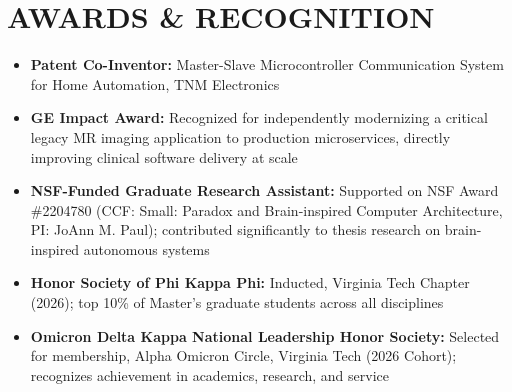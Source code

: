 \documentclass[letterpaper,10pt]{article}
\begin{document}
\section*{AWARDS \& RECOGNITION}
\begin{itemize}
    \item \textbf{Patent Co-Inventor:} Master-Slave Microcontroller Communication System for Home Automation, TNM Electronics
    \item \textbf{GE Impact Award:} Recognized for independently modernizing a critical legacy MR imaging application to production microservices, directly improving clinical software delivery at scale
    \item \textbf{NSF-Funded Graduate Research Assistant:} Supported on NSF Award \#2204780 (CCF: Small: Paradox and Brain-inspired Computer Architecture, PI: JoAnn M. Paul); contributed significantly to thesis research on brain-inspired autonomous systems
    \item \textbf{Honor Society of Phi Kappa Phi:} Inducted, Virginia Tech Chapter (2026); top 10\% of Master's graduate students across all disciplines
    \item \textbf{Omicron Delta Kappa National Leadership Honor Society:} Selected for membership, Alpha Omicron Circle, Virginia Tech (2026 Cohort); recognizes achievement in academics, research, and service
\end{itemize}
\end{document}
